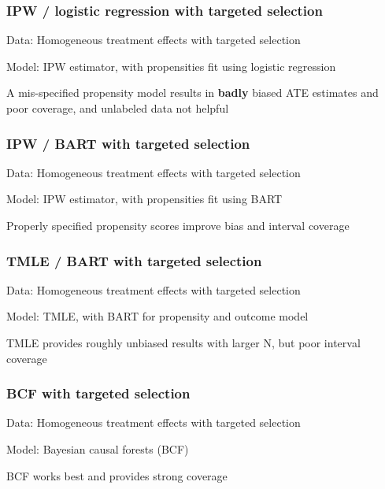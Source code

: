 \documentclass[compress]{beamer}
\begin{document}
\begin{frame} \frametitle{IPW / logistic regression with targeted selection}
Data: Homogeneous treatment effects with targeted selection

Model: IPW estimator, with propensities fit using logistic regression



A mis-specified propensity model results in \textbf{badly} biased ATE estimates
and poor coverage, and unlabeled data not helpful

%
\transboxin
\end{frame}

\begin{frame} \frametitle{IPW / BART with targeted selection}
Data: Homogeneous treatment effects with targeted selection

Model: IPW estimator, with propensities fit using BART



Properly specified propensity scores improve bias and interval coverage

\transboxin
\end{frame}

\begin{frame} \frametitle{TMLE / BART with targeted selection}
Data: Homogeneous treatment effects with targeted selection

Model: TMLE, with BART for propensity and outcome model



TMLE provides roughly unbiased results with larger N, but poor interval coverage

\transboxin
\end{frame}

\begin{frame} \frametitle{BCF with targeted selection}
Data: Homogeneous treatment effects with targeted selection

Model: Bayesian causal forests (BCF)



BCF works best and provides strong coverage

\transboxin
\end{frame}
\end{document}
